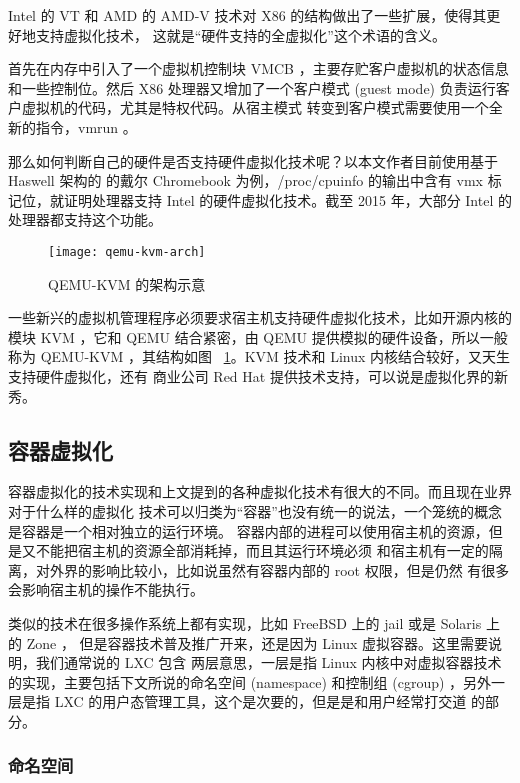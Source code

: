 Intel 的 VT 和 AMD 的 AMD-V 技术对 X86 的结构做出了一些扩展，使得其更好地支持虚拟化技术，
这就是“硬件支持的全虚拟化”这个术语的含义。

首先在内存中引入了一个虚拟机控制块 VMCB ，主要存贮客户虚拟机的状态信息和一些控制位。然后 X86
处理器又增加了一个客户模式 (guest mode) 负责运行客户虚拟机的代码，尤其是特权代码。从宿主模式
转变到客户模式需要使用一个全新的指令，vmrun 。

那么如何判断自己的硬件是否支持硬件虚拟化技术呢？以本文作者目前使用基于 Haswell 架构的
的戴尔 Chromebook 为例，/proc/cpuinfo 的输出中含有 vmx 标记位，就证明处理器支持
 Intel 的硬件虚拟化技术。截至 2015 年，大部分 Intel 的处理器都支持这个功能。

 \begin{figure}[h]
     \centering
     \texttt{[image: qemu-kvm-arch]}
     \caption{QEMU-KVM 的架构示意}
     \label{fig:qemu-kvm-arch}
 \end{figure}

一些新兴的虚拟机管理程序必须要求宿主机支持硬件虚拟化技术，比如开源内核的模块 KVM ，它和 QEMU
结合紧密，由 QEMU 提供模拟的硬件设备，所以一般称为 QEMU-KVM ，其结构如图
~\ref{fig:qemu-kvm-arch}。KVM 技术和 Linux 内核结合较好，又天生支持硬件虚拟化，还有
商业公司 Red Hat 提供技术支持，可以说是虚拟化界的新秀。

\subsection{容器虚拟化}

容器虚拟化的技术实现和上文提到的各种虚拟化技术有很大的不同。而且现在业界对于什么样的虚拟化
技术可以归类为“容器”也没有统一的说法，一个笼统的概念是容器是一个相对独立的运行环境。
容器内部的进程可以使用宿主机的资源，但是又不能把宿主机的资源全部消耗掉，而且其运行环境必须
和宿主机有一定的隔离，对外界的影响比较小，比如说虽然有容器内部的 root 权限，但是仍然
有很多会影响宿主机的操作不能执行。

类似的技术在很多操作系统上都有实现，比如 FreeBSD 上的 jail 或是 Solaris 上的 Zone ，
但是容器技术普及推广开来，还是因为 Linux 虚拟容器。这里需要说明，我们通常说的 LXC 包含
两层意思，一层是指 Linux 内核中对虚拟容器技术的实现，主要包括下文所说的命名空间 (namespace)
和控制组 (cgroup) ，另外一层是指 LXC 的用户态管理工具，这个是次要的，但是是和用户经常打交道
的部分。

\subsubsection{命名空间}
\label{subsubsec:namespace}

